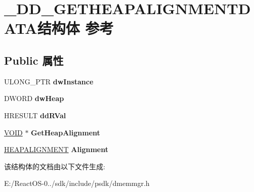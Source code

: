 \hypertarget{struct___d_d___g_e_t_h_e_a_p_a_l_i_g_n_m_e_n_t_d_a_t_a}{}\section{\+\_\+\+D\+D\+\_\+\+G\+E\+T\+H\+E\+A\+P\+A\+L\+I\+G\+N\+M\+E\+N\+T\+D\+A\+T\+A结构体 参考}
\label{struct___d_d___g_e_t_h_e_a_p_a_l_i_g_n_m_e_n_t_d_a_t_a}
\subsection*{Public 属性}
\begin{DoxyCompactItemize}
\item 
\mbox{\label{struct___d_d___g_e_t_h_e_a_p_a_l_i_g_n_m_e_n_t_d_a_t_a_ad46ca2bf17c289efa4cc84e37c714a21}} 
U\+L\+O\+N\+G\+\_\+\+P\+TR {\bfseries dw\+Instance}
\item 
\mbox{\label{struct___d_d___g_e_t_h_e_a_p_a_l_i_g_n_m_e_n_t_d_a_t_a_a87d2657b1cb3718b803270b5c134046f}} 
D\+W\+O\+RD {\bfseries dw\+Heap}
\item 
\mbox{\label{struct___d_d___g_e_t_h_e_a_p_a_l_i_g_n_m_e_n_t_d_a_t_a_a6be994ab5084ec2a46c896f046a96f06}} 
H\+R\+E\+S\+U\+LT {\bfseries dd\+R\+Val}
\item 
\mbox{\label{struct___d_d___g_e_t_h_e_a_p_a_l_i_g_n_m_e_n_t_d_a_t_a_a8d8c5b8bd5410c05ec503052efe791f8}} 
\hyperlink{interfacevoid}{V\+O\+ID} $\ast$ {\bfseries Get\+Heap\+Alignment}
\item 
\mbox{\label{struct___d_d___g_e_t_h_e_a_p_a_l_i_g_n_m_e_n_t_d_a_t_a_ad77dae33f070bdea49101a528d5a11ec}} 
\hyperlink{struct___h_e_a_p_a_l_i_g_n_m_e_n_t}{H\+E\+A\+P\+A\+L\+I\+G\+N\+M\+E\+NT} {\bfseries Alignment}
\end{DoxyCompactItemize}


该结构体的文档由以下文件生成\+:\begin{DoxyCompactItemize}
\item 
E\+:/\+React\+O\+S-\/0../sdk/include/psdk/dmemmgr.\+h\end{DoxyCompactItemize}
